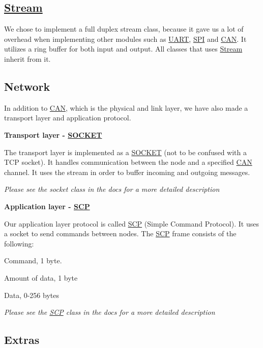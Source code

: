 \subsection*{\hyperlink{class_stream}{Stream}}

We chose to implement a full duplex stream class, because it gave us a lot of overhead when implementing other modules such as \hyperlink{class_u_a_r_t}{U\+A\+RT}, \hyperlink{namespace_s_p_i}{S\+PI} and \hyperlink{class_c_a_n}{C\+AN}. It utilizes a ring buffer for both input and output. All classes that uses \hyperlink{class_stream}{Stream} inherit from it.

\subsection*{Network}

In addition to \hyperlink{class_c_a_n}{C\+AN}, which is the physical and link layer, we have also made a transport layer and application protocol.

{\bfseries Transport layer -\/ \hyperlink{class_s_o_c_k_e_t}{S\+O\+C\+K\+ET}}

The transport layer is implemented as a \hyperlink{class_s_o_c_k_e_t}{S\+O\+C\+K\+ET} (not to be confused with a T\+CP socket). It handles communication between the node and a specified \hyperlink{class_c_a_n}{C\+AN} channel. It uses the stream in order to buffer incoming and outgoing messages.

{\itshape Please see the socket class in the docs for a more detailed description}

{\bfseries Application layer -\/ \hyperlink{class_s_c_p}{S\+CP}}

Our application layer protocol is called \hyperlink{class_s_c_p}{S\+CP} (Simple Command Protocol). It uses a socket to send commands between nodes. The \hyperlink{class_s_c_p}{S\+CP} frame consists of the following\+:


\begin{DoxyItemize}
\item Command, 1 byte.
\item Amount of data, 1 byte
\item Data, 0-\/256 bytes
\end{DoxyItemize}

{\itshape Please see the \hyperlink{class_s_c_p}{S\+CP} class in the docs for a more detailed description}

\subsection*{Extras}

